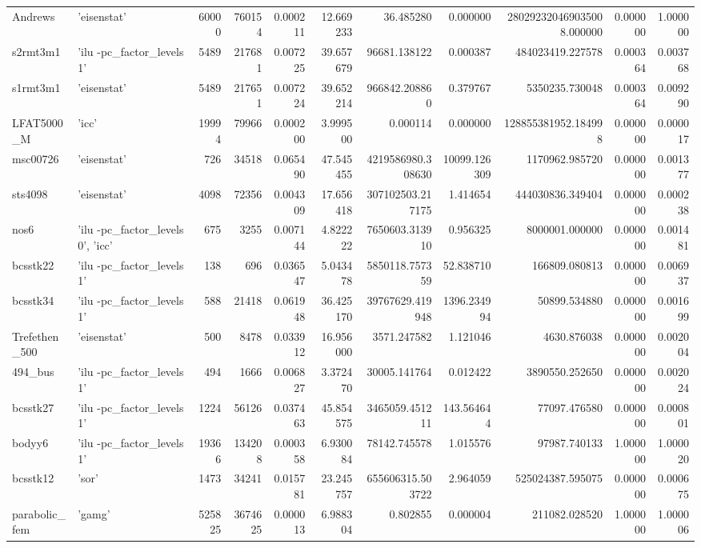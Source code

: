 \begin{tabular}{llrrrrrrrrr}
Andrews & {'eisenstat'} & 60000 & 760154 & 0.000211 & 12.669233 & 36.485280 & 0.000000 & 280292320469035008.000000 & 0.000000 & 1.000000 \\
s2rmt3m1 & {'ilu -pc\_factor\_levels 1'} & 5489 & 217681 & 0.007225 & 39.657679 & 96681.138122 & 0.000387 & 484023419.227578 & 0.000364 & 0.003768 \\
s1rmt3m1 & {'eisenstat'} & 5489 & 217651 & 0.007224 & 39.652214 & 966842.208860 & 0.379767 & 5350235.730048 & 0.000364 & 0.009290 \\
LFAT5000\_M & {'icc'} & 19994 & 79966 & 0.000200 & 3.999500 & 0.000114 & 0.000000 & 128855381952.184998 & 0.000000 & 0.000017 \\
msc00726 & {'eisenstat'} & 726 & 34518 & 0.065490 & 47.545455 & 4219586980.308630 & 10099.126309 & 1170962.985720 & 0.000000 & 0.001377 \\
sts4098 & {'eisenstat'} & 4098 & 72356 & 0.004309 & 17.656418 & 307102503.217175 & 1.414654 & 444030836.349404 & 0.000000 & 0.000238 \\
nos6 & {'ilu -pc\_factor\_levels 0', 'icc'} & 675 & 3255 & 0.007144 & 4.822222 & 7650603.313910 & 0.956325 & 8000001.000000 & 0.000000 & 0.001481 \\
bcsstk22 & {'ilu -pc\_factor\_levels 1'} & 138 & 696 & 0.036547 & 5.043478 & 5850118.757359 & 52.838710 & 166809.080813 & 0.000000 & 0.006937 \\
bcsstk34 & {'ilu -pc\_factor\_levels 1'} & 588 & 21418 & 0.061948 & 36.425170 & 39767629.419948 & 1396.234994 & 50899.534880 & 0.000000 & 0.001699 \\
Trefethen\_500 & {'eisenstat'} & 500 & 8478 & 0.033912 & 16.956000 & 3571.247582 & 1.121046 & 4630.876038 & 0.000000 & 0.002004 \\
494\_bus & {'ilu -pc\_factor\_levels 1'} & 494 & 1666 & 0.006827 & 3.372470 & 30005.141764 & 0.012422 & 3890550.252650 & 0.000000 & 0.002024 \\
bcsstk27 & {'ilu -pc\_factor\_levels 1'} & 1224 & 56126 & 0.037463 & 45.854575 & 3465059.451211 & 143.564644 & 77097.476580 & 0.000000 & 0.000801 \\
bodyy6 & {'ilu -pc\_factor\_levels 1'} & 19366 & 134208 & 0.000358 & 6.930084 & 78142.745578 & 1.015576 & 97987.740133 & 1.000000 & 1.000020 \\
bcsstk12 & {'sor'} & 1473 & 34241 & 0.015781 & 23.245757 & 655606315.503722 & 2.964059 & 525024387.595075 & 0.000000 & 0.000675 \\
parabolic\_fem & {'gamg'} & 525825 & 3674625 & 0.000013 & 6.988304 & 0.802855 & 0.000004 & 211082.028520 & 1.000000 & 1.000006 \\

\end{tabular}

